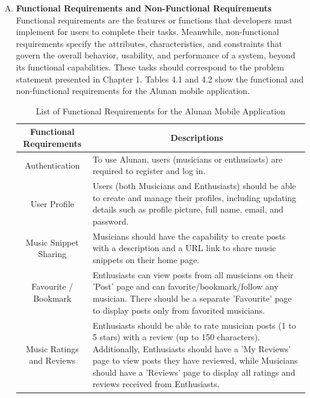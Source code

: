 \begin{enumerate}[A.]
    \item \textbf{Functional Requirements and Non-Functional Requirements} \\ Functional requirements are the features or functions that developers must implement for users to complete their tasks. Meanwhile, non-functional requirements specify the attributes, characteristics, and constraints that govern the overall behavior, usability, and performance of a system, beyond its functional capabilities. These tasks should correspond to the problem statement presented in Chapter 1. Tables 4.1 and 4.2 show the functional and non-functional requirements for the Alunan mobile application. \\
    
    \begin{table}[htb]
        \caption{List of Functional Requirements for the Alunan Mobile Application}
        \label{tab:mytable}
        \centering
        \begin{tabular}{|p{7.5cm}|p{9.5cm}|}
        \hline
        \multicolumn{1}{|c|}{\textbf{Functional Requirements}} & 
        \multicolumn{1}{c|}{\textbf{Descriptions}} \\
        \hline 
        \multicolumn{1}{|c|}{Authentication} & To use Alunan, users (musicians or enthusiasts) are required to register and log in. \\ \hline
        \multicolumn{1}{|c|}{User Profile} & Users (both Musicians and Enthusiasts) should be able to create and manage their profiles, including updating details such as profile picture, full name, email, and password. \\ \hline
        \multicolumn{1}{|c|}{Music Snippet Sharing} & Musicians should have the capability to create posts with a description and a URL link to share music snippets on their home page. \\ \hline
        \multicolumn{1}{|c|}{Favourite / Bookmark} & Enthusiasts can view posts from all musicians on their 'Post' page and can favorite/bookmark/follow any musician. There should be a separate 'Favourite' page to display posts only from favorited musicians. \\ \hline
        \multicolumn{1}{|c|}{Music Ratings and Reviews} & Enthusiasts should be able to rate musician posts (1 to 5 stars) with a review (up to 150 characters). Additionally, Enthusiasts should have a 'My Reviews' page to view posts they have reviewed, while Musicians should have a 'Reviews' page to display all ratings and reviews received from Enthusiasts. \\ \hline
        \end{tabular}
    \end{table}


\end{enumerate}
